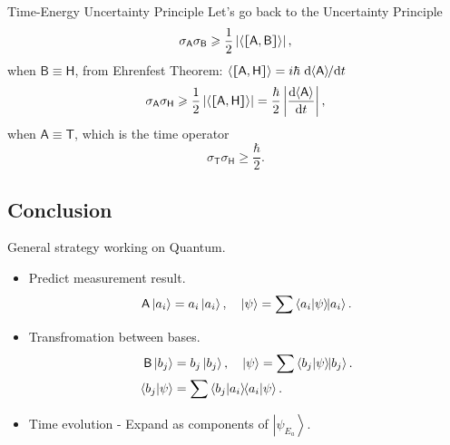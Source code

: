 \documentclass{article}
\def\d{{\rm d}}
\def\sA{\mathsf A}\def\sB{\mathsf B}\def\sC{\mathsf C}\def\sX{\mathsf X}\def\sP{\mathsf P}\def\sH{\mathsf H}\def\sK{\mathsf K}\def\sL{\mathsf L}\def\sS{\mathsf S}\def\sM{\mathsf M}\def\sT{\mathsf T}
\newcommand{\ko}[1]{\hspace{-#1 pt}}%
\newcommand{\ds}[2]{\frac{\d #1}{\d #2}}%
\newcommand{\ave}[1]{\left\langle #1\right\rangle}%
\newcommand{\ket}[1]{\left\vert #1\right\rangle}
\newcommand{\brkt}[2]{\left\langle #1\middle\vert#2\right\rangle}
\newcommand{\cmm}[1]{\lfloor\ko{4.45}\lceil #1\rceil\ko{4.45}\rfloor}%
\begin{document}
\begin{theorem}{Time-Energy Uncertainty Principle}{}
	Let's go back to the Uncertainty Principle
	$$\sigma_\sA\sigma_\sB\geqslant\frac12\left|\ave{\cmm{\sA,\sB}}\right|,$$
	when $\sB\equiv\sH$, from Ehrenfest Theorem: $\ave{\cmm{\sA,\sH}}=i\hbar~\d\ko2\ave\sA\ko3/\d t$
	$$\sigma_\sA\sigma_\sH\geqslant\frac12\left|\ave{\cmm{\sA,\sH}}\right|=\frac{\hbar}2\left|\ds{\ko2\ave\sA}t\right|,$$
	when $\sA\equiv\sT$, which is the time operator
	$$\sigma_\sT\sigma_\sH\geqslant\frac{\hbar}2.$$
\end{theorem}
\subsection{Conclusion}
General strategy working on Quantum.
\begin{itemize}
	\item Predict measurement result.
	      $$\sA\ket{a_i}=a_i\ket{a_i},\quad\ket\psi=\sum\brkt{a_i}\psi\ko3\ket{a_i}.$$
	\item Transfromation between bases.
	      \begin{align*}
		      \sB\ket{b_j}   & =b_j\ket{b_j},\quad\ket\psi=\sum\brkt{b_j}\psi\ko3\ket{b_j}. \\
		      \brkt{b_j}\psi & =\sum\brkt{b_j}{a_i}\ko3\brkt{a_i}\psi.
	      \end{align*}
	\item Time evolution - Expand as components of $\ket{\psi_{E_a}}$.
\end{itemize}
\clearpage
\end{document}
